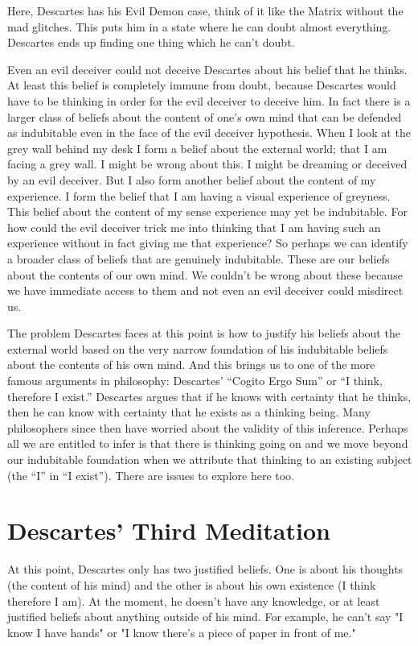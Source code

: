 Here, Descartes has his Evil Demon case, think of it like the Matrix without the mad glitches. This puts him in a state where he can doubt almost everything. Descartes ends up finding one thing which he can't doubt.

Even an evil deceiver could not deceive Descartes about his belief that he thinks. At least this belief is completely immune from doubt, because Descartes would have to be thinking in order for the evil deceiver to deceive him. In fact there is a larger class of beliefs about the content of one’s own mind that can be defended as indubitable even in the face of the evil deceiver hypothesis. When I look at the grey wall behind my desk I form a belief about the external world; that I am facing a grey wall. I might be wrong about this. I might be dreaming or deceived by an evil deceiver. But I also form another belief about the content of my experience. I form the belief that I am having a visual experience of greyness. This belief about the content of my sense experience may yet be indubitable. For how could the evil deceiver trick me into thinking that I am having such an experience without in fact giving me that experience? So perhaps we can identify a broader class of beliefs that are genuinely indubitable. These are our beliefs about the contents of our own mind. We couldn’t be wrong about these because we have immediate access to them and not even an evil deceiver could misdirect us.

The problem Descartes faces at this point is how to justify his beliefs about the external world based on the very narrow foundation of his indubitable beliefs about the contents of his own mind. And this brings us to one of the more famous arguments in philosophy: Descartes’ “Cogito Ergo Sum” or “I think, therefore I exist.” Descartes argues that if he knows with certainty that he thinks, then he can know with certainty that he exists as a thinking being. Many philosophers since then have worried about the validity of this inference. Perhaps all we are entitled to infer is that there is thinking going on and we move beyond our indubitable foundation when we attribute that thinking to an existing subject (the “I” in “I exist”). There are issues to explore here too. 

\section{Descartes' Third Meditation}
At this point, Descartes only has two justified beliefs. One is about his thoughts (the content of his mind) and the other is about his own existence (I think therefore I am). At the moment, he doesn't have any knowledge, or at least justified beliefs about anything outside of his mind. For example, he can't say "I know I have hands" or "I know there's a piece of paper in front of me."

